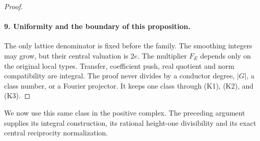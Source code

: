 \documentclass[11pt]{article}
\theoremstyle{definition}
\theoremstyle{remark}
\begin{document}
\begin{proof}
\paragraph{9. Uniformity and the boundary of this proposition.}
The only lattice denominator is fixed before the family. The
smoothing integers may grow, but their central valuation is $2e$.
The multiplier $F_E$ depends only on the original local types.
Transfer, coefficient push, real quotient and norm compatibility
are integral. The proof never divides by a conductor degree,
$|G|$, a class number, or a Fourier projector. It keeps one class
through (K1), (K2), and (K3).
\end{proof}

We now use this same class in the positive complex. The preceding
argument supplies its integral construction, its rational height-one
divisibility and its exact central reciprocity normalization.
\end{document}
